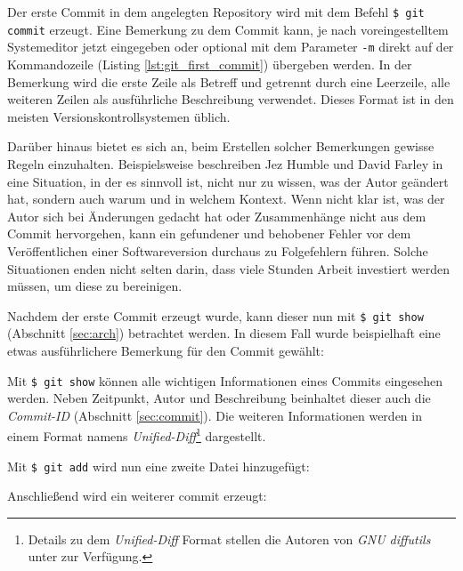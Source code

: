 Der erste Commit in dem angelegten Repository wird mit dem Befehl \texttt{\$
git commit} erzeugt. Eine Bemerkung zu dem Commit kann, je nach
voreingestelltem Systemeditor jetzt eingegeben oder optional mit dem Parameter
\texttt{-m} direkt auf der Kommandozeile (Listing \ref{lst:git_first_commit})
übergeben werden. In der Bemerkung wird die erste Zeile als Betreff und
getrennt durch eine Leerzeile, alle weiteren Zeilen als ausführliche
Beschreibung verwendet. Dieses Format ist in den meisten
Versionskontrollsystemen üblich.


Darüber hinaus bietet es sich an, beim Erstellen solcher Bemerkungen gewisse
Regeln einzuhalten. Beispielsweise beschreiben Jez Humble und David Farley in
\cite[S.~37]{cd} eine Situation, in der es sinnvoll ist, nicht nur zu wissen,
was der Autor geändert hat, sondern auch warum und in welchem Kontext. Wenn
nicht klar ist, was der Autor sich bei Änderungen gedacht hat oder
Zusammenhänge nicht aus dem Commit hervorgehen, kann ein gefundener und
behobener Fehler vor dem Veröffentlichen einer Softwareversion durchaus zu
Folgefehlern führen. Solche Situationen enden nicht selten darin, dass viele
Stunden Arbeit investiert werden müssen, um diese zu bereinigen.
\cite[S.~37]{cd}

Nachdem der erste Commit erzeugt wurde, kann dieser nun mit \texttt{\$ git
show} (Abschnitt \ref{sec:arch}) betrachtet werden. In diesem Fall wurde
beispielhaft eine etwas ausführlichere Bemerkung für den Commit gewählt:


Mit \texttt{\$ git show} können alle wichtigen Informationen eines Commits
eingesehen werden. Neben Zeitpunkt, Autor und Beschreibung beinhaltet dieser
auch die \textit{Commit-ID} (Abschnitt \ref{sec:commit}). Die weiteren
Informationen werden in einem Format namens
\textit{Unified-Diff}\footnote{Details zu dem \textit{Unified-Diff} Format
stellen die Autoren von \textit{GNU diffutils} unter
\cite[S.~12-13]{paper:diffutils} zur Verfügung.} dargestellt. \cite[25]{gitosp}

Mit \texttt{\$ git add} wird nun eine zweite Datei hinzugefügt:


Anschließend wird ein weiterer \gls{commit} erzeugt:

